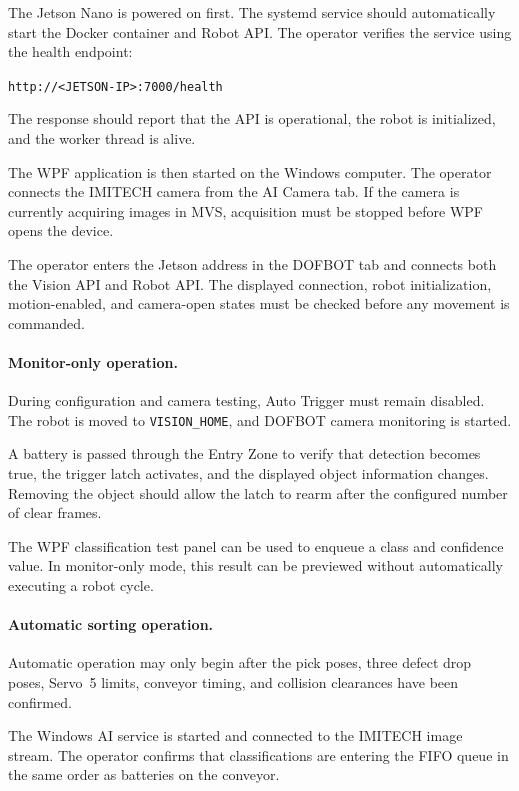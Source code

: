 The Jetson Nano is powered on first. The systemd service should automatically start the Docker container and Robot API. The operator verifies the service using the health endpoint:

\begin{center}
    \texttt{http://<JETSON-IP>:7000/health}
\end{center}

The response should report that the API is operational, the robot is initialized, and the worker thread is alive.

The WPF application is then started on the Windows computer. The operator connects the IMITECH camera from the AI Camera tab. If the camera is currently acquiring images in MVS, acquisition must be stopped before WPF opens the device.

The operator enters the Jetson address in the DOFBOT tab and connects both the Vision API and Robot API. The displayed connection, robot initialization, motion-enabled, and camera-open states must be checked before any movement is commanded.

\paragraph{Monitor-only operation.}
During configuration and camera testing, Auto Trigger must remain disabled. The robot is moved to \texttt{VISION\_HOME}, and DOFBOT camera monitoring is started.

A battery is passed through the Entry Zone to verify that detection becomes true, the trigger latch activates, and the displayed object information changes. Removing the object should allow the latch to rearm after the configured number of clear frames.

The WPF classification test panel can be used to enqueue a class and confidence value. In monitor-only mode, this result can be previewed without automatically executing a robot cycle.

\paragraph{Automatic sorting operation.}
Automatic operation may only begin after the pick poses, three defect drop poses, Servo~5 limits, conveyor timing, and collision clearances have been confirmed.

The Windows AI service is started and connected to the IMITECH image stream. The operator confirms that classifications are entering the FIFO queue in the same order as batteries on the conveyor.

